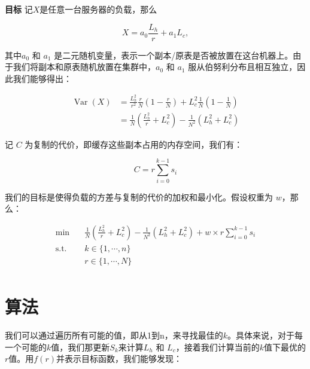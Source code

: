 \par \textbf{目标} \quad  记$X$是任意一台服务器的负载，那么

\begin{equation}
    X=a_{0} \frac{L_{h}}{r}+a_{1} L_c,
\end{equation}

\par 其中$a_0$ 和 $ a_1$ 是二元随机变量，表示一个副本/原表是否被放置在这台机器上。由于我们将副本和原表随机放置在集群中，$a_0$ 和 $ a_1$ 服从伯努利分布且相互独立，因此我们能够得出：

\begin{equation}
\begin{split}
\operatorname{Var}(X)&=\frac{L_{h}^{2}}{r^{2}}\frac{r}{N}\left(1-\frac{r}{N}\right)+L_{c}^{2}\frac{1}{N}\left(1-\frac{1}{N}\right) \\
& = \frac{1}{N}\left(\frac{L_{h}^{2}}{r}+L_{c}^{2}\right) - \frac{1}{N^2}\left( L_h^2 + L_c^2\right)
\end{split}
\end{equation}

\par 记 $C$ 为复制的代价，即缓存这些副本占用的内存空间，我们有：

\begin{equation}
    C = r \sum_{i=0}^{k-1} s_i
\end{equation}

\par 我们的目标是使得负载的方差与复制的代价的加权和最小化。假设权重为 $w$，那么：

\begin{equation}
\label{eq:obj}
\begin{aligned}
\min \quad & \frac{1}{N}\left(\frac{L_{h}^{2}}{r}+L_{c}^{2}\right) - \frac{1}{N^2}\left( L_h^2 + L_c^2\right) + w\times r \sum_{i=0}^{k-1} s_i\\
\textrm{s.t.} \quad & k \in \{1, \cdots, n\}\\
& r \in \{1, \cdots, N\}    \\
\end{aligned}
\end{equation}

\section{算法}

\par 我们可以通过遍历所有可能的值，即从1到n，来寻找最佳的$k$。具体来说，对于每一个可能的$k$值，我们那更新$S_k$来计算$L_h$ 和 $L_c$，接着我们计算当前的$k$值下最优的$r$值。用$f(r)$并表示目标函数，我们能够发现：

